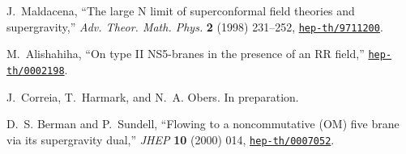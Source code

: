 \documentclass[a4paper,twoside,titlepage,12pt]{article}
\begin{document}
\begin{thebibliography}{10}
J.~Maldacena, ``The large {N} limit of superconformal field theories and
  supergravity,'' {\em Adv. Theor. Math. Phys.} {\bf 2} (1998) 231--252,
  \href{http://xxx.lanl.gov/abs/hep-th/9711200}{{\tt hep-th/9711200}}.

M.~Alishahiha, ``On type {II} {NS5-branes} in the presence of an {RR} field,''
  \href{http://xxx.lanl.gov/abs/hep-th/0002198}{{\tt hep-th/0002198}}.

J.~Correia, T.~Harmark, and N.~A. Obers. In preparation.

D.~S. Berman and P.~Sundell, ``Flowing to a noncommutative {(OM)} five brane
  via its supergravity dual,'' {\em JHEP} {\bf 10} (2000) 014,
  \href{http://xxx.lanl.gov/abs/hep-th/0007052}{{\tt hep-th/0007052}}.

\end{thebibliography}\endgroup
\end{document}
